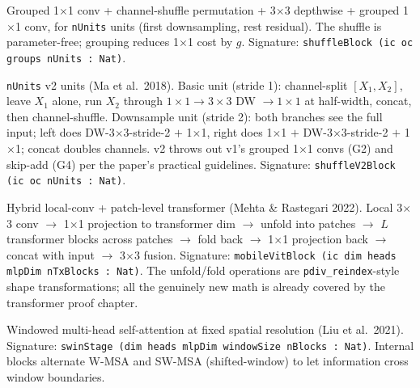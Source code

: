 \begin{definition}
  \label{layer:shuffleBlock}
  \leanok
  Grouped 1$\times$1 conv + channel-shuffle permutation + 3$\times$3
  depthwise + grouped 1$\times$1 conv, for \texttt{nUnits} units
  (first downsampling, rest residual). The shuffle is parameter-free;
  grouping reduces 1$\times$1 cost by $g$. Signature:
  \texttt{shuffleBlock (ic oc groups nUnits : Nat)}.
\end{definition}

\begin{definition}
  \label{layer:shuffleV2Block}
  \leanok
  \texttt{nUnits} v2 units (Ma et al.\ 2018). Basic unit (stride 1):
  channel-split $[X_1, X_2]$, leave $X_1$ alone, run $X_2$ through
  $1\times 1 \to 3\times 3$ DW $\to 1\times 1$ at half-width, concat, then
  channel-shuffle. Downsample unit (stride 2): both branches see the
  full input; left does DW-3$\times$3-stride-2 $+$ 1$\times$1, right does
  1$\times$1 $+$ DW-3$\times$3-stride-2 $+$ 1$\times$1; concat doubles
  channels. v2 throws out v1's grouped 1$\times$1 convs (G2) and
  skip-add (G4) per the paper's practical guidelines. Signature:
  \texttt{shuffleV2Block (ic oc nUnits : Nat)}.
\end{definition}

\begin{definition}
  \label{layer:mobileVitBlock}
  \leanok
  Hybrid local-conv + patch-level transformer (Mehta \& Rastegari
  2022). Local 3$\times$3 conv $\to$ 1$\times$1 projection to transformer
  dim $\to$ unfold into patches $\to$ $L$ transformer blocks across
  patches $\to$ fold back $\to$ 1$\times$1 projection back $\to$ concat
  with input $\to$ 3$\times$3 fusion. Signature:
  \texttt{mobileVitBlock (ic dim heads mlpDim nTxBlocks : Nat)}.
  The unfold/fold operations are \texttt{pdiv\_reindex}-style shape
  transformations; all the genuinely new math is already covered by
  the transformer proof chapter.
\end{definition}

\begin{definition}
  \label{layer:swinStage}
  \leanok
  Windowed multi-head self-attention at fixed spatial resolution (Liu
  et al.\ 2021). Signature:
  \texttt{swinStage (dim heads mlpDim windowSize nBlocks : Nat)}. Internal
  blocks alternate W-MSA and SW-MSA (shifted-window) to let information
  cross window boundaries.
\end{definition}

